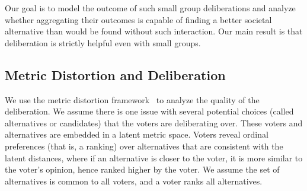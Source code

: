 



Our goal is to model the outcome of such small group deliberations and analyze whether aggregating their outcomes is capable of finding a better societal alternative than would be found without such interaction. Our main result is that deliberation is strictly helpful even with small groups.

\subsection{Metric Distortion and Deliberation} 
We use the metric distortion framework~\cite{AnshelevichBEPS18} to analyze the quality of the deliberation. We assume there is one issue with several potential choices (called alternatives or candidates) that the voters are deliberating over. These voters and alternatives are embedded in a latent metric space. Voters reveal ordinal preferences (that is, a ranking) over alternatives that are consistent with the latent distances, where if an alternative is closer to the voter, it is more similar to the voter's opinion, hence ranked higher by the voter. %
We assume the set of alternatives is common to all voters, and a voter ranks all alternatives.

